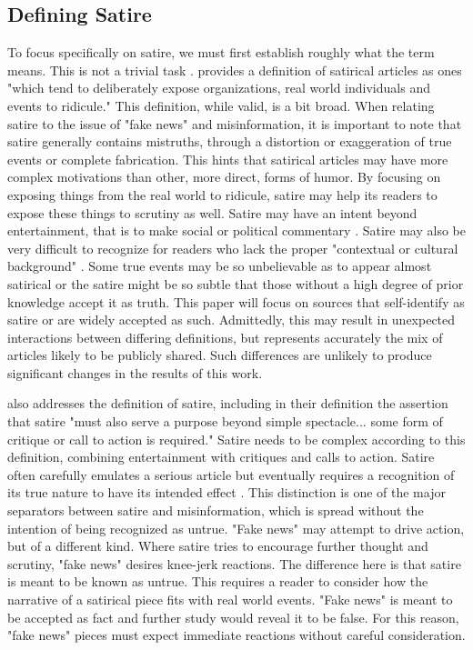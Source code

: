 \documentclass [12 pt] {report}
\begin{document}
\subsection{Defining Satire}
To focus specifically on satire, we must first establish roughly what the term means. This is not a trivial task \cite{defSatire}. \cite{Ahmad} provides a definition of satirical articles as ones "which tend to deliberately expose organizations, real world individuals and events to ridicule." This definition, while valid, is a bit broad. When relating satire to the issue of "fake news" and misinformation, it is important to note that satire generally contains mistruths, through a distortion or exaggeration of true events or complete fabrication. This hints that satirical articles may have more complex motivations than other, more direct, forms of humor. By focusing on exposing things from the real world to ridicule, satire may help its readers to expose these things to scrutiny as well. Satire may have an intent beyond entertainment, that is to make social or political commentary \cite{defSatire}. Satire may also be very difficult to recognize for readers who lack the proper "contextual or cultural background" \cite{Yang}. Some true events may be so unbelievable as to appear almost satirical or the satire might be so subtle that those without a high degree of prior knowledge accept it as truth. This paper will focus on sources that self-identify as satire or are widely accepted as such. Admittedly, this may result in unexpected interactions between differing definitions, but represents accurately the mix of articles likely to be publicly shared. Such differences are unlikely to produce significant changes in the results of this work.

\cite{fakeNews} also addresses the definition of satire, including in their definition the assertion that satire "must also serve a purpose beyond simple spectacle... some form of critique or call to action is required." Satire needs to be complex according to this definition, combining entertainment with critiques and calls to action. Satire often carefully emulates a serious article but eventually requires a recognition of its true nature to have its intended effect \cite{fakeNews}. This distinction is one of the major separators between satire and misinformation, which is spread without the intention of being recognized as untrue. "Fake news" may attempt to drive action, but of a different kind. Where satire tries to encourage further thought and scrutiny, "fake news" desires knee-jerk reactions. The difference here is that satire is meant to be known as untrue. This requires a reader to consider how the narrative of a satirical piece fits with real world events. "Fake news" is meant to be accepted as fact and further study would reveal it to be false. For this reason, "fake news" pieces must expect immediate reactions without careful consideration.
\end{document}
